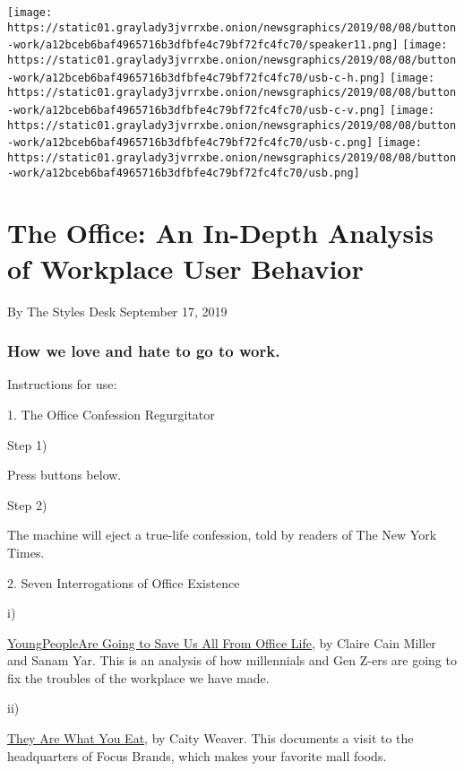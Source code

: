 \texttt{[image: https://static01.graylady3jvrrxbe.onion/newsgraphics/2019/08/08/button-work/a12bceb6baf4965716b3dfbfe4c79bf72fc4fc70/speaker11.png]}
\texttt{[image: https://static01.graylady3jvrrxbe.onion/newsgraphics/2019/08/08/button-work/a12bceb6baf4965716b3dfbfe4c79bf72fc4fc70/usb-c-h.png]}
\texttt{[image: https://static01.graylady3jvrrxbe.onion/newsgraphics/2019/08/08/button-work/a12bceb6baf4965716b3dfbfe4c79bf72fc4fc70/usb-c-v.png]}
\texttt{[image: https://static01.graylady3jvrrxbe.onion/newsgraphics/2019/08/08/button-work/a12bceb6baf4965716b3dfbfe4c79bf72fc4fc70/usb-c.png]}
\texttt{[image: https://static01.graylady3jvrrxbe.onion/newsgraphics/2019/08/08/button-work/a12bceb6baf4965716b3dfbfe4c79bf72fc4fc70/usb.png]}

\hypertarget{the-office-an-in-depth-analysis-of-workplace-user-behavior-1}{%
\section{The Office: An In-Depth Analysis of Workplace User
Behavior}\label{the-office-an-in-depth-analysis-of-workplace-user-behavior-1}}

By The Styles Desk September 17, 2019

\hypertarget{how-we-love-and-hate-to-go-to-work}{%
\subsubsection{How we love and hate to go to
work.}\label{how-we-love-and-hate-to-go-to-work}}

Instructions for use:

1. The Office Confession Regurgitator

Step 1)

Press buttons below.

Step 2)

The machine will eject a true-life confession, told by readers of The
New York Times.

2. Seven Interrogations of Office Existence

i)

\protect\hyperlink{elev1}{Young}\protect\hyperlink{elev1}{People}\protect\hyperlink{elev1}{}\protect\hyperlink{elev1}{Are
Going to Save Us All From Office Life}, by Claire Cain Miller and Sanam
Yar. This is an analysis of how millennials and Gen Z-ers are going to
fix the troubles of the workplace we have made.

ii)

\protect\hyperlink{elev2}{They Are What You Eat}, by Caity Weaver. This
documents a visit to the headquarters of Focus Brands, which makes your
favorite mall foods.

